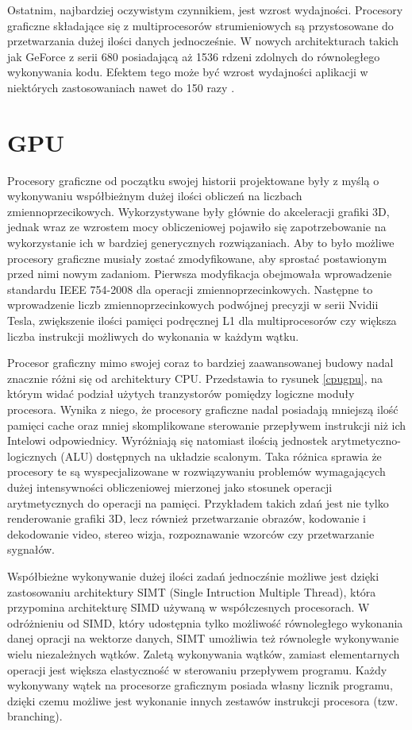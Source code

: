 Ostatnim, najbardziej oczywistym czynnikiem, jest wzrost wydajności. Procesory
graficzne składające się z multiprocesorów strumieniowych są przystosowane do
przetwarzania dużej ilości danych jednocześnie. W nowych architekturach takich
jak GeForce z serii 680 posiadającą aż 1536 rdzeni zdolnych do równoległego
wykonywania kodu. Efektem tego może być wzrost wydajności aplikacji w niektórych
zastosowaniach nawet do 150 razy \cite{prez}.

\section{GPU}

Procesory graficzne od początku swojej historii projektowane były z myślą o
wykonywaniu współbieżnym dużej ilości obliczeń na liczbach zmiennoprzecikowych. 
Wykorzystywane były głównie do akceleracji grafiki 3D, jednak wraz ze wzrostem mocy obliczeniowej
pojawiło się zapotrzebowanie na wykorzystanie ich w bardziej
generycznych rozwiązaniach. Aby to było możliwe procesory graficzne musiały
zostać zmodyfikowane, aby sprostać postawionym przed nimi nowym zadaniom.
Pierwsza modyfikacja obejmowała wprowadzenie standardu IEEE 754-2008 dla
operacji zmiennoprzecinkowych. Następne to wprowadzenie liczb
zmiennoprzecinkowych podwójnej precyzji w serii Nvidii Tesla, zwiększenie ilości
pamięci podręcznej L1 dla multiprocesorów czy większa liczba instrukcji
możliwych do wykonania w każdym wątku.

Procesor graficzny mimo swojej coraz to bardziej zaawansowanej budowy nadal
znacznie różni się od architektury CPU. Przedstawia to rysunek \ref{cpugpu}, na
którym widać podział użytych tranzystorów pomiędzy logiczne moduły procesora.
Wynika z niego, że procesory graficzne nadal posiadają mniejszą ilość pamięci cache oraz
mniej skomplikowane sterowanie przepływem instrukcji niż ich Intelowi
odpowiednicy. Wyróżniają się natomiast ilością jednostek arytmetyczno-logicznych
(ALU) dostępnych na układzie scalonym. Taka różnica sprawia że procesory te są wyspecjalizowane w rozwiązywaniu
problemów wymagających dużej intensywności obliczeniowej mierzonej jako stosunek
operacji arytmetycznych do operacji na pamięci. Przykładem takich zdań jest nie tylko 
renderowanie grafiki 3D, lecz również przetwarzanie obrazów, kodowanie i
dekodowanie video, stereo wizja, rozpoznawanie wzorców czy przetwarzanie sygnałów.

Współbieżne wykonywanie dużej ilości zadań jednoczśnie możliwe jest dzięki 
zastosowaniu architektury SIMT (Single Intruction Multiple Thread), która
przypomina architekturę SIMD używaną w współczesnych procesorach. W
odróżnieniu od SIMD, który udostępnia tylko możliwość równoległego wykonania danej
opracji na wektorze danych, SIMT umożliwia też równoległe wykonywanie wielu
niezależnych wątków. Zaletą wykonywania wątków, zamiast elementarnych operacji jest większa
elastyczność w sterowaniu przepływem programu. Każdy wykonywany wątek
na procesorze graficznym posiada własny licznik programu, dzięki czemu możliwe
jest wykonanie innych zestawów instrukcji procesora (tzw. branching).

